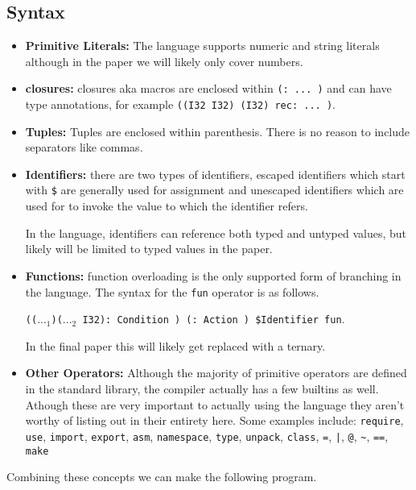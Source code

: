 \documentclass{article}
\begin{document}
\subsection{Syntax}
\begin{itemize}
    \item \textbf{Primitive Literals:} The language supports numeric and string literals although in the paper we will likely only cover numbers.

    \item \textbf{closures:} closures aka macros are enclosed within \texttt{(: ... )} and can have type annotations, for example \texttt{((I32 I32) (I32) rec: ... )}.

    \item \textbf{Tuples:} Tuples are enclosed within parenthesis. There is no reason to include separators like commas.

    \item \textbf{Identifiers:} there are two types of identifiers, escaped identifiers which start with \texttt{\$} are generally used for assignment and unescaped identifiers which are used for to invoke the value to which the identifier refers.
    
    In the language, identifiers can reference both typed and untyped values, but likely will be limited to typed values in the paper.

    \item \textbf{Functions:} function overloading is the only supported form of branching in the language. The syntax for the \texttt{fun} operator is as follows. 

    \texttt{(($..._1$)($..._2$ I32): Condition ) (: Action ) \$Identifier fun}.

    In the final paper this will likely get replaced with a ternary.

    \item \textbf{Other Operators:} Although the majority of primitive operators are defined in the standard library, the compiler actually has a few builtins as well. Athough these are very important to actually using the language they aren't worthy of listing out in their entirety here. Some examples include: \texttt{require}, \texttt{use}, \texttt{import}, \texttt{export}, \texttt{asm}, \texttt{namespace}, \texttt{type}, \texttt{unpack}, \texttt{class}, \texttt{=}, \texttt{|}, \texttt{@}, \texttt{\~}, \texttt{==}, \texttt{make}
\end{itemize}
    
    Combining these concepts we can make the following program.
    
\end{document}
